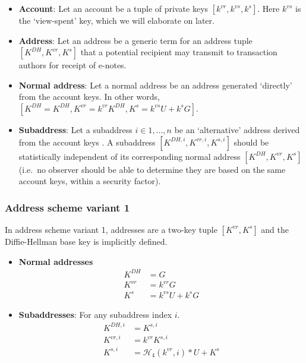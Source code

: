 \begin{itemize}
    \item \textbf{Account}: Let an account be a tuple of private keys $[k^{vr}, k^{vs}, k^s]$. Here $k^{vs}$ is the `view-spent' key, which we will elaborate on later.

    \item \textbf{Address}: Let an address be a generic term for an address tuple $[K^{DH}, K^{vr}, K^s]$ that a potential recipient may transmit to transaction authors for receipt of e-notes.

    \item \textbf{Normal address}: Let a normal address be an address generated `directly' from the account keys. In other words, $[K^{DH} = K^{DH}, K^{vr} = k^{vr} K^{DH}, K^s = k^{vs} U + k^s G]$.

    \item \textbf{Subaddress}: Let a subaddress $i \in 1,...,n$ be an `alternative' address derived from the account keys \cite{MRL-0006-subaddresses, subaddress-pull-request}. A subaddress $[K^{DH,i}, K^{vr,i}, K^{s,i}]$ should be statistically independent of its corresponding normal address $[K^{DH}, K^{vr}, K^s]$ (i.e.\ no observer should be able to determine they are based on the same account keys, within a security factor).
\end{itemize}

\subsubsection{Address scheme variant 1}

In address scheme variant 1, addresses are a two-key tuple $[K^{vr}, K^s]$ and the Diffie-Hellman base key is implicitly defined.

\begin{itemize}
    \item \textbf{Normal addresses}
    \begin{align*}
        K^{DH} &= G  \\
        K^{vr} &= k^{vr} G  \\
        K^{s} &= k^{vs} U + k^s G
    \end{align*}

    \item \textbf{Subaddresses}: For any subaddress index $i$.\vspace{.115cm}
    \begin{align*}
        K^{DH,i} &= K^{s,i}  \\
        K^{vr,i} &= k^{vr} K^{s,i}  \\
        K^{s,i} &= \mathcal{H}_4(k^{vr},i)*U + K^s
    \end{align*}
\end{itemize}

